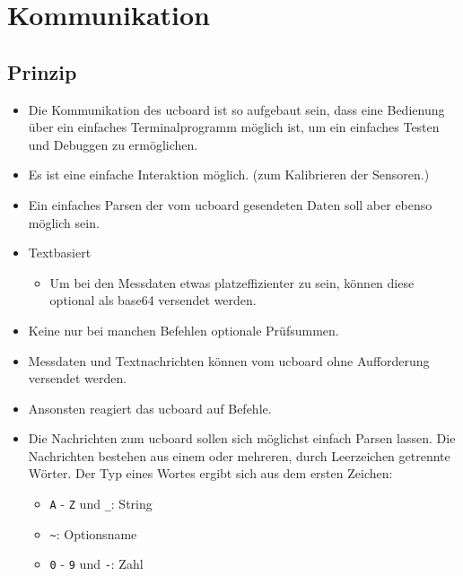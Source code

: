 
\chapter{Kommunikation}


\section{Prinzip}


\begin{itemize}
	\item Die Kommunikation des ucboard ist so aufgebaut sein, dass eine Bedienung über ein einfaches Terminalprogramm möglich ist, um ein einfaches Testen und Debuggen zu ermöglichen.
	\item Es ist eine einfache Interaktion möglich. (\ZB zum Kalibrieren der Sensoren.)
	\item Ein einfaches Parsen der vom ucboard gesendeten Daten soll aber ebenso möglich sein.
\end{itemize}


\begin{itemize}
	\item Textbasiert
		\begin{itemize}
			\item Um bei den Messdaten etwas platzeffizienter zu sein, können diese optional als base64 versendet werden.
		\end{itemize}
	\item Keine \bzw nur bei manchen Befehlen optionale Prüfsummen.
	\item Messdaten und Textnachrichten können vom ucboard ohne Aufforderung versendet werden.
	\item Ansonsten reagiert das ucboard auf Befehle.
\end{itemize}

\begin{itemize}
	\item Die Nachrichten zum ucboard sollen sich möglichst einfach Parsen lassen. Die Nachrichten bestehen aus einem oder mehreren, durch Leerzeichen getrennte Wörter. Der Typ eines Wortes ergibt sich aus dem ersten Zeichen:
		\begin{itemize}
			\item \texttt{A} - \texttt{Z} und \texttt{\_}: String
			\item \verb+~+: Optionsname
			\item \texttt{0} - \texttt{9} und \texttt{-}: Zahl
		\end{itemize}
\end{itemize}



